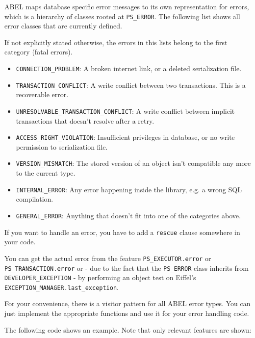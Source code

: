 \documentclass[a4paper,12pt]{report}
\begin{document}
ABEL maps database specific error messages to its own representation for errors, which is a hierarchy of classes rooted at \lstinline!PS_ERROR!.
The following list shows all error classes that are currently defined.

If not explicitly stated otherwise, the errors in this lists belong to the first category (fatal errors).

\begin{itemize}
\item \lstinline!CONNECTION_PROBLEM!: A broken internet link, or a deleted serialization file.
\item \lstinline!TRANSACTION_CONFLICT!: A write conflict between two transactions. This is a recoverable error.
\item \lstinline!UNRESOLVABLE_TRANSACTION_CONFLICT!: A write conflict between implicit transactions that doesn't resolve after a retry.
\item \lstinline!ACCESS_RIGHT_VIOLATION!: Insufficient privileges in database, or no write permission to serialization file.
\item \lstinline!VERSION_MISMATCH!: The stored version of an object isn't compatible any more to the current type.
\item \lstinline!INTERNAL_ERROR!: Any error happening inside the library, e.g. a wrong SQL compilation.
\item \lstinline!GENERAL_ERROR!: Anything that doesn't fit into one of the categories above.
\end{itemize}

If you want to handle an error, you have to add a \lstinline{rescue} clause somewhere in your code.

You can get the actual error from the feature \lstinline!PS_EXECUTOR.error! or \lstinline!PS_TRANSACTION.error! or - due to the fact that the \lstinline!PS_ERROR! class inherits from \lstinline!DEVELOPER_EXCEPTION! -
by performing an object test on Eiffel's \lstinline!EXCEPTION_MANAGER.last_exception!.

For your convenience, there is a visitor pattern for all ABEL error types. 
You can just implement the appropriate functions and use it for your error handling code.

The following code shows an example. 
Note that only relevant features are shown:
\end{document}
